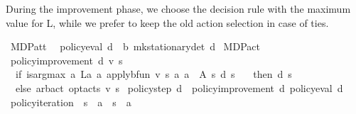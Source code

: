 \begin{isabellebody}
\begin{isamarkuptext}
During the improvement phase, we choose the decision rule with the maximum value for L, 
while we prefer to keep the old action selection in case of ties.%
\end{isamarkuptext}\isamarkuptrue%
\isamarkupfalse%
\ MDP{\isacharunderscore}{\kern0pt}att{\isacharunderscore}{\kern0pt}{\isasymL}\ \isanewline
{}\isamarkupfalse%
\ {\isachardoublequoteopen}policy{\isacharunderscore}{\kern0pt}eval\ d\ {\isacharequal}{\kern0pt}\ {\isasymnu}\isactrlsub b\ {\isacharparenleft}{\kern0pt}mk{\isacharunderscore}{\kern0pt}stationary{\isacharunderscore}{\kern0pt}det\ d{\isacharparenright}{\kern0pt}{\isachardoublequoteclose}\isanewline
{}\isamarkupfalse%
\isanewline
\isanewline
{}\isamarkupfalse%
\ MDP{\isacharunderscore}{\kern0pt}act\isanewline
{}\isanewline
\isanewline
{}\isamarkupfalse%
\ {\isachardoublequoteopen}policy{\isacharunderscore}{\kern0pt}improvement\ d\ v\ s\ {\isacharequal}{\kern0pt}\ {\isacharparenleft}{\kern0pt}\isanewline
\ \ if\ is{\isacharunderscore}{\kern0pt}arg{\isacharunderscore}{\kern0pt}max\ {\isacharparenleft}{\kern0pt}{\isasymlambda}a{\isachardot}{\kern0pt}\ L\isactrlsub a\ a\ {\isacharparenleft}{\kern0pt}apply{\isacharunderscore}{\kern0pt}bfun\ v{\isacharparenright}{\kern0pt}\ s{\isacharparenright}{\kern0pt}\ {\isacharparenleft}{\kern0pt}{\isasymlambda}a{\isachardot}{\kern0pt}\ a\ {\isasymin}\ A\ s{\isacharparenright}{\kern0pt}\ {\isacharparenleft}{\kern0pt}d\ s{\isacharparenright}{\kern0pt}\ \isanewline
\ \ then\ d\ s\isanewline
\ \ else\ arb{\isacharunderscore}{\kern0pt}act\ {\isacharparenleft}{\kern0pt}opt{\isacharunderscore}{\kern0pt}acts\ v\ s{\isacharparenright}{\kern0pt}{\isacharparenright}{\kern0pt}{\isachardoublequoteclose}\isanewline
\isanewline
{}\isamarkupfalse%
\ {\isachardoublequoteopen}policy{\isacharunderscore}{\kern0pt}step\ d\ {\isacharequal}{\kern0pt}\ policy{\isacharunderscore}{\kern0pt}improvement\ d\ {\isacharparenleft}{\kern0pt}policy{\isacharunderscore}{\kern0pt}eval\ d{\isacharparenright}{\kern0pt}{\isachardoublequoteclose}\isanewline
\isanewline
\isanewline
{}\isamarkupfalse%
\ policy{\isacharunderscore}{\kern0pt}iteration\ {\isacharcolon}{\kern0pt}{\isacharcolon}{\kern0pt}\ {\isachardoublequoteopen}{\isacharparenleft}{\kern0pt}{\isacharprime}{\kern0pt}s\ {\isasymRightarrow}\ {\isacharprime}{\kern0pt}a{\isacharparenright}{\kern0pt}\ {\isasymRightarrow}\ {\isacharparenleft}{\kern0pt}{\isacharprime}{\kern0pt}s\ {\isasymRightarrow}\ {\isacharprime}{\kern0pt}a{\isacharparenright}{\kern0pt}{\isachardoublequoteclose}\ \isanewline

\end{isabellebody}
